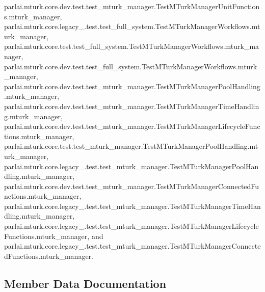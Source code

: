 parlai.\+mturk.\+core.\+dev.\+test.\+test\+\_\+mturk\+\_\+manager.\+Test\+M\+Turk\+Manager\+Unit\+Functions.\+mturk\+\_\+manager, parlai.\+mturk.\+core.\+legacy\+\_.\+test.\+test\+\_\+full\+\_\+system.\+Test\+M\+Turk\+Manager\+Workflows.\+mturk\+\_\+manager, parlai.\+mturk.\+core.\+test.\+test\+\_\+full\+\_\+system.\+Test\+M\+Turk\+Manager\+Workflows.\+mturk\+\_\+manager, parlai.\+mturk.\+core.\+dev.\+test.\+test\+\_\+full\+\_\+system.\+Test\+M\+Turk\+Manager\+Workflows.\+mturk\+\_\+manager, parlai.\+mturk.\+core.\+dev.\+test.\+test\+\_\+mturk\+\_\+manager.\+Test\+M\+Turk\+Manager\+Pool\+Handling.\+mturk\+\_\+manager, parlai.\+mturk.\+core.\+dev.\+test.\+test\+\_\+mturk\+\_\+manager.\+Test\+M\+Turk\+Manager\+Time\+Handling.\+mturk\+\_\+manager, parlai.\+mturk.\+core.\+dev.\+test.\+test\+\_\+mturk\+\_\+manager.\+Test\+M\+Turk\+Manager\+Lifecycle\+Functions.\+mturk\+\_\+manager, parlai.\+mturk.\+core.\+test.\+test\+\_\+mturk\+\_\+manager.\+Test\+M\+Turk\+Manager\+Pool\+Handling.\+mturk\+\_\+manager, parlai.\+mturk.\+core.\+legacy\+\_.\+test.\+test\+\_\+mturk\+\_\+manager.\+Test\+M\+Turk\+Manager\+Pool\+Handling.\+mturk\+\_\+manager, parlai.\+mturk.\+core.\+dev.\+test.\+test\+\_\+mturk\+\_\+manager.\+Test\+M\+Turk\+Manager\+Connected\+Functions.\+mturk\+\_\+manager, parlai.\+mturk.\+core.\+legacy\+\_.\+test.\+test\+\_\+mturk\+\_\+manager.\+Test\+M\+Turk\+Manager\+Time\+Handling.\+mturk\+\_\+manager, parlai.\+mturk.\+core.\+legacy\+\_.\+test.\+test\+\_\+mturk\+\_\+manager.\+Test\+M\+Turk\+Manager\+Lifecycle\+Functions.\+mturk\+\_\+manager, and parlai.\+mturk.\+core.\+legacy\+\_.\+test.\+test\+\_\+mturk\+\_\+manager.\+Test\+M\+Turk\+Manager\+Connected\+Functions.\+mturk\+\_\+manager.



\subsection{Member Data Documentation}
\mbox{\label{classparlai_1_1mturk_1_1core_1_1test_1_1test__mturk__manager_1_1TestMTurkManagerPoolHandling_a59131f0fadad672f2b28623196b1dc0f}} 
